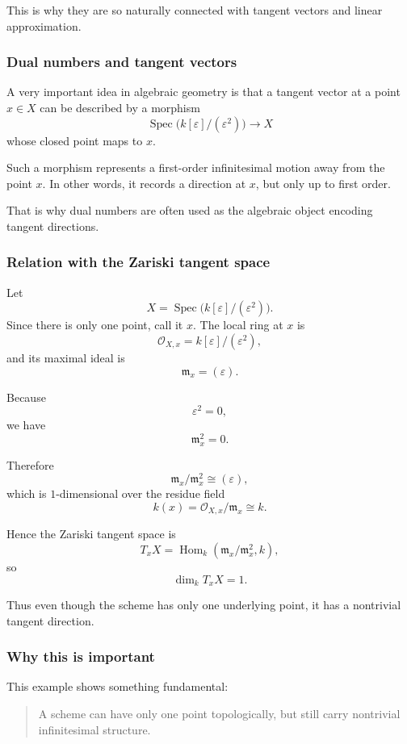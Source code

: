 \documentclass[12pt,a4paper]{article}
\theoremstyle{plain}
\theoremstyle{definition}      %
\begin{document}
	This is why they are so naturally connected with tangent vectors and linear approximation.
	
	\subsubsection*{Dual numbers and tangent vectors}
	
	A very important idea in algebraic geometry is that a tangent vector at a point \(x\in X\) can be described by a morphism
	\[
	\operatorname{Spec}\bigl(k[\varepsilon]/(\varepsilon^2)\bigr)\to X
	\]
	whose closed point maps to \(x\).
	
	Such a morphism represents a first-order infinitesimal motion away from the point \(x\). In other words, it records a direction at \(x\), but only up to first order.
	
	That is why dual numbers are often used as the algebraic object encoding tangent directions.
	
	\subsubsection*{Relation with the Zariski tangent space}
	
	Let
	\[
	X=\operatorname{Spec}\bigl(k[\varepsilon]/(\varepsilon^2)\bigr).
	\]
	Since there is only one point, call it \(x\). The local ring at \(x\) is
	\[
	\mathcal O_{X,x}=k[\varepsilon]/(\varepsilon^2),
	\]
	and its maximal ideal is
	\[
	\mathfrak m_x=(\varepsilon).
	\]
	
	Because
	\[
	\varepsilon^2=0,
	\]
	we have
	\[
	\mathfrak m_x^2=0.
	\]
	
	Therefore
	\[
	\mathfrak m_x/\mathfrak m_x^2
	\cong
	(\varepsilon),
	\]
	which is \(1\)-dimensional over the residue field
	\[
	k(x)=\mathcal O_{X,x}/\mathfrak m_x\cong k.
	\]
	
	Hence the Zariski tangent space is
	\[
	T_xX=\operatorname{Hom}_k(\mathfrak m_x/\mathfrak m_x^2,k),
	\]
	so
	\[
	\dim_k T_xX=1.
	\]
	
	Thus even though the scheme has only one underlying point, it has a nontrivial tangent direction.
	
	\subsubsection*{Why this is important}
	
	This example shows something fundamental:
	
	\begin{quote}
		A scheme can have only one point topologically, but still carry nontrivial infinitesimal structure.
	\end{quote}
	
\end{document}
